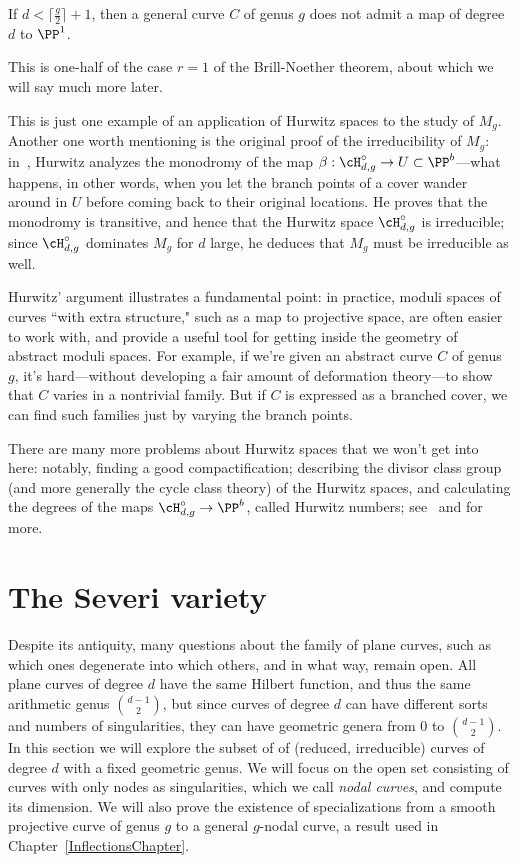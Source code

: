 \begin{corollary}
If $d < \lceil \frac{g}{2} \rceil + 1$, then a general curve $C$ of genus $g$ does not admit a map of degree $d$ to $\PP^1$.
\end{corollary}

This is one-half of the case $r=1$ of the Brill-Noether theorem, about which we will say much more later.

This is just one example of an application of Hurwitz spaces to the study of $M_g$. Another one worth mentioning is the original proof of the irreducibility of $M_g$: in~\cite{Hurwitz}, Hurwitz analyzes the monodromy of the map $\beta: \cH^\circ_{d,g} \to U \subset \PP^b$---what happens, in other words, when you let the branch points of a cover wander around in $U$ before coming back to their original locations. He proves that the monodromy is transitive, and hence that the Hurwitz space $\cH^\circ_{d,g}$ is irreducible; since $\cH^\circ_{d,g}$ dominates $M_g$ for $d$ large, he deduces that $M_g$ must be irreducible as well.

Hurwitz' argument illustrates a fundamental point: in practice, moduli spaces of curves ``with extra structure," such as a map to projective space, are often easier to work with, and provide a useful tool for getting inside the geometry of abstract moduli spaces. For example, if we're given an abstract curve $C$ of genus $g$, it's hard---without developing a fair amount of deformation theory---to show that $C$ varies in a nontrivial family. But if $C$ is expressed as a branched cover, we can find such families just by varying the branch points.

There are many more problems about Hurwitz spaces that we won't get into here: notably, finding a good compactification; describing the divisor class group (and more generally the cycle class theory) of the Hurwitz spaces, and calculating the degrees of the maps $\cH^\circ_{d,g} \to \PP^b$, called Hurwitz numbers; see~\cite{Hurwitz2} and \cite{ELSV} for more.

\section{The Severi variety}\label{severi variety}

Despite its antiquity, many questions about the family of plane curves, such as which ones degenerate into which others, and in what way, remain open. All plane curves of degree $d$ have the same Hilbert function, and thus the same arithmetic genus
$\binom{d-1}{2}$, but since curves of degree $d$ can have different sorts and numbers of singularities, they can have geometric genera from 0 to $\binom{d-1}{2}$. In this section we will explore the subset of of (reduced, irreducible) curves of degree $d$ with a fixed geometric genus. We will focus on the open set consisting of curves with only nodes as singularities, which we call \emph{nodal curves}, and compute its dimension. We will also prove the existence of specializations from a smooth projective curve of genus $g$ to a general $g$-nodal curve, a result used in Chapter~\ref{InflectionsChapter}.


